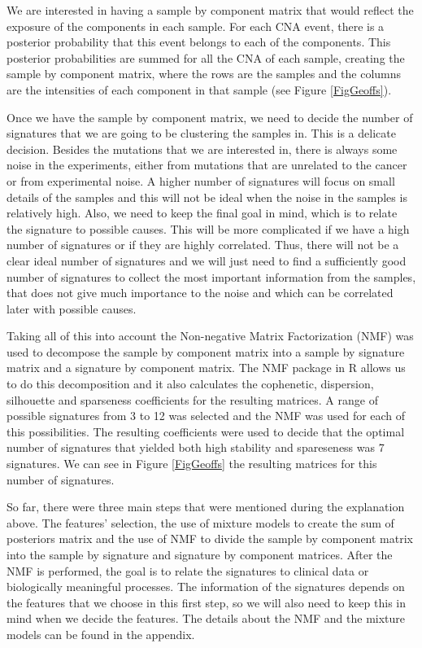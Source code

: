 \documentclass[a4paper]{article}
\begin{document}
We are interested in having a sample by component matrix that would reflect the exposure of the components in each sample. For each CNA event, there is a posterior probability that this event belongs to each of the components. This posterior probabilities are summed for all the CNA of each sample, creating the sample by component matrix, where the rows are the samples and the columns are the intensities of each component in that sample (see Figure \ref{FigGeoffs}). 

Once we have the sample by component matrix, we need to decide the number of signatures that we are going to be clustering the samples in. This is a delicate decision. Besides the mutations that we are interested in, there is always some noise in the experiments, either from mutations that are unrelated to the cancer or from experimental noise. A higher number of signatures will focus on small details of the samples and this will not be ideal when the noise in the samples is relatively high. Also, we need to keep the final goal in mind, which is to relate the signature to possible causes. This will be more complicated if we have a high number of signatures or if they are highly correlated. Thus, there will not be a clear ideal number of signatures and we will just need to find a sufficiently good number of signatures to collect the most important information from the samples, that does not give much importance to the noise and which can be correlated later with possible causes. 

Taking all of this into account the Non-negative Matrix Factorization (NMF) was used to decompose the sample by component matrix into a sample by signature matrix and a signature by component matrix. The NMF package in R \cite{NMFR} allows us to do this decomposition and it also calculates the cophenetic, dispersion, silhouette and sparseness coefficients for the resulting matrices. A range of possible signatures from 3 to 12 was selected and the NMF was used for each of this possibilities. The resulting coefficients were used to decide that the optimal number of signatures that yielded both high stability and spareseness was 7 signatures. We can see in Figure \ref{FigGeoffs} the resulting matrices for this number of signatures.

So far, there were three main steps that were mentioned during the explanation above. The features' selection, the use of mixture models to create the sum of posteriors matrix and the use of NMF to divide the sample by component matrix into the sample by signature and signature by component matrices. After the NMF is performed, the goal is to relate the signatures to clinical data or biologically meaningful processes. The information of the signatures depends on the features that we choose in this first step, so we will also need to keep this in mind when we decide the features. The details about the NMF and the mixture models can be found in the appendix.
\end{document}
